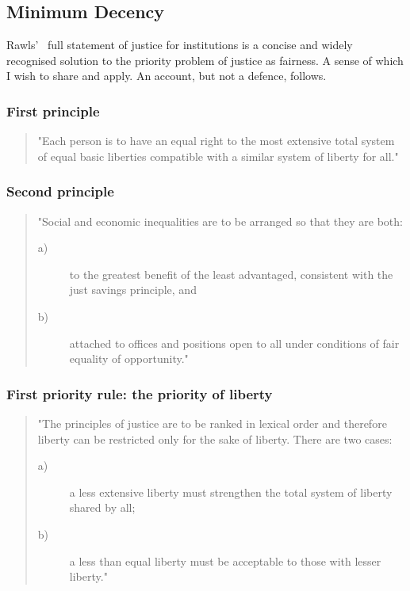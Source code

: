 \documentclass[11pt, oneside]{article}   	%
\begin{document}
\subsection{Minimum Decency}

Rawls'~\cite{jr1} full statement of justice for institutions is a concise and widely recognised solution to the priority problem of justice as fairness. A sense of which I wish to share and apply. An account, but not a defence, follows.

\subsubsection{First principle}

\begin{quote}
"Each person is to have an equal right to the most extensive total system of equal basic liberties compatible with a similar system of liberty for all."
\end{quote}

\subsubsection{Second principle}

\begin{quote}
"Social and economic inequalities are to be arranged so that they are both:
\begin{description}
\item[ a)] to the greatest benefit of the least advantaged, consistent with the just savings principle, and
\item[ b)] attached to offices and positions open to all under conditions of fair equality of opportunity."
\end{description}
\end{quote}

\subsubsection{First priority rule: the priority of liberty}

\begin{quote}
"The principles of justice are to be ranked in lexical order and therefore liberty can be restricted only for the sake of liberty.
There are two cases:
\begin{description}
\item[ a)] a less extensive liberty must strengthen the total system of liberty shared by all;
\item[ b)] a less than equal liberty must be acceptable to those with lesser liberty."
\end{description}
\end{quote}
\end{document}
